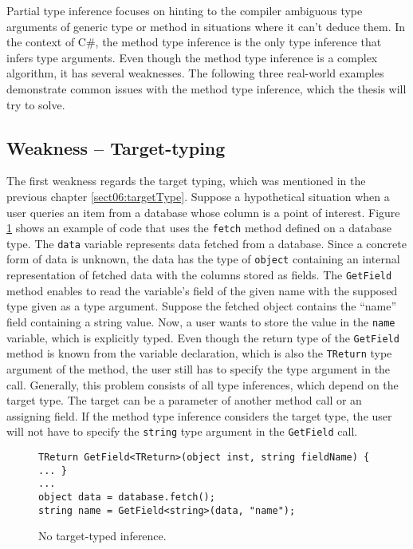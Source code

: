 Partial type inference focuses on hinting to the compiler ambiguous type arguments of generic type or method in situations where it can’t deduce them. 
In the context of C\#, the method type inference is the only type inference that infers type arguments. 
Even though the method type inference is a complex algorithm, it has several weaknesses. 
The following three real-world examples demonstrate common issues with the method type inference, which the thesis will try to solve.

\subsection{Weakness -- Target-typing}
The first weakness regards the target typing, which was mentioned in the previous chapter \ref{sect06:targetType}. 
Suppose a hypothetical situation when a user queries an item from a database whose column is a point of interest. 
Figure \ref{img27:usecase1} shows an example of code that uses the \texttt{fetch} method defined on a database type. 
The \texttt{data} variable represents data fetched from a database. 
Since a concrete form of data is unknown, the data has the type of \texttt{object} containing an internal representation of fetched data with the columns stored as fields. 
The \texttt{GetField} method enables to read the variable’s field of the given name with the supposed type given as a type argument. 
Suppose the fetched object contains the ``name'' field containing a string value. 
Now, a user wants to store the value in the \texttt{name} variable, which is explicitly typed. 
Even though the return type of the \texttt{GetField} method is known from the variable declaration, which is also the \texttt{TReturn} type argument of the method, the user still has to specify the type argument in the call. 
Generally, this problem consists of all type inferences, which depend on the target type. The target can be a parameter of another method call or an assigning field. 
If the method type inference considers the target type, the user will not have to specify the \texttt{string} type argument in the \texttt{GetField} call.
\begin{figure}[h]
\begin{lstlisting}[style=csharp]
TReturn GetField<TReturn>(object inst, string fieldName) { ... }
...
object data = database.fetch();
string name = GetField<string>(data, "name");
\end{lstlisting}
\caption{No target-typed inference.}
\label{img27:usecase1}
\end{figure}

